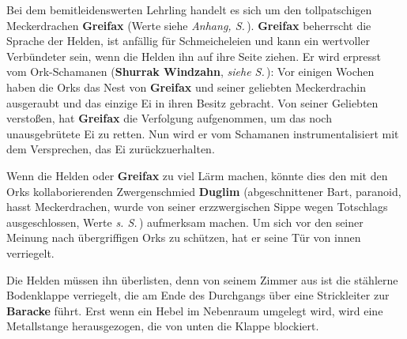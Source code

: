 
Bei dem bemitleidenswerten Lehrling handelt es sich um den tollpatschigen Meckerdrachen \textbf{Greifax} (Werte siehe \emph{Anhang, S.\,\pageref{greifax}}).
 \textbf{Greifax} beherrscht die Sprache der Helden, ist anfällig für Schmeicheleien und kann ein wertvoller Verbündeter sein, wenn die Helden ihn auf ihre Seite ziehen.
Er wird erpresst vom Ork-Schamanen (\textbf{Shurrak Windzahn}, \emph{siehe S.\,\pageref{finale}}):
Vor einigen Wochen haben die Orks das Nest von \textbf{Greifax} und seiner geliebten Meckerdrachin ausgeraubt und das einzige Ei in ihren Besitz gebracht.
Von seiner Geliebten verstoßen, hat \textbf{Greifax} die Verfolgung aufgenommen, um das noch unausgebrütete Ei zu retten.
Nun wird er vom Schamanen instrumentalisiert mit dem Versprechen, das Ei zurückzuerhalten.

Wenn die Helden oder \textbf{Greifax} zu viel Lärm machen, könnte dies den mit den Orks kollaborierenden Zwergenschmied \textbf{Duglim} (abgeschnittener Bart, paranoid, hasst Meckerdrachen, wurde von seiner erzzwergischen Sippe wegen Totschlags ausgeschlossen, Werte \emph{s. S.\,\pageref{duglim}}) aufmerksam machen.
Um sich vor den seiner Meinung nach übergriffigen Orks zu schützen, hat er seine Tür von innen verriegelt.

Die Helden müssen ihn überlisten, denn von seinem Zimmer aus ist die stählerne Bodenklappe verriegelt, die am Ende des Durchgangs über eine Strickleiter zur \textbf{Baracke} führt.
Erst wenn ein Hebel im Nebenraum umgelegt wird, wird eine Metallstange herausgezogen, die von unten die Klappe blockiert.


